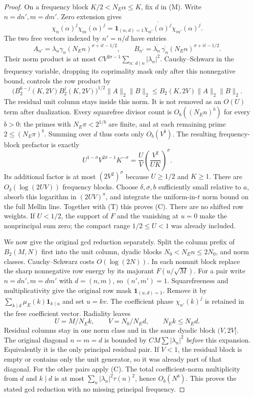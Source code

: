 \documentclass[11pt]{article}
\theoremstyle{remark}\newtheorem{remark}[theorem]{Remark}
\begin{document}
\begin{proof}
On a frequency block $K/2<N_E\alpha\le K$, fix $d$ in (M).
Write $n=dn',m=dm'$. Zero extension gives
\[
 \overline{\chi_n(\alpha)^j}\chi_m(\alpha)^j
 =\mathbf1_{(\alpha,d)=1}
             \overline{\chi_{n'}(\alpha)^j}\chi_{m'}(\alpha)^j.
\]
The two free vectors indexed by $n'=n/d$ have entries
\[
 A_{n'}=\lambda_n\gamma_n(N_En)^{\sigma+it-1/2},
 \qquad
 B_{n'}=\overline{\lambda_n}\,\overline{\gamma_n}
                          (N_En)^{\sigma+it-1/2}.
\]
Their norm product is at most
$C V^{2\sigma-1}\sum_{n:\,d\mid n}|\lambda_n|^2$.
Cauchy--Schwarz in the frequency variable, dropping its
coprimality mask only after this nonnegative bound, controls
the row product by
\[
 \bigl(B_2^{6-j}(K,2V)B_2^j(K,2V)\bigr)^{1/2}
                \|A\|_2\|B\|_2
 \le B_2(K,2V)\|A\|_2\|B\|_2.
\]
The residual unit column stays inside this norm. It is not
removed as an $O(U)$ term after dualization.
Every squarefree divisor count is $O_b((N_En)^b)$ for every $b>0$:
the primes with $N_E\pi<2^{1/b}$ are finite, and at each remaining
prime $2\le(N_E\pi)^b$.
Summing over $d$ thus costs only $O_b(V^b)$.
The resulting frequency-block prefactor is exactly
\[
 U^{1-\sigma}V^{2\sigma-1}K^{-\sigma}
 =\frac UV\left(\frac{V^2}{UK}\right)^\sigma.
\]
Its additional factor is at most $(2V^2)^\sigma$ because
$U\ge1/2$ and $K\ge1$. There are $O_\delta(\log(2UV))$ frequency
blocks. Choose $\delta,\sigma,b$ sufficiently small relative
to $a$, absorb this logarithm in $(2UV)^a$, and integrate the
uniform-in-$t$ norm bound on the full Mellin line. Together
with (T) this proves (C). There are no shifted row weights.
If $U<1/2$, the support of $F$ and the vanishing at $u=0$
make the nonprincipal sum zero; the compact range
$1/2\le U<1$ was already included.

We now give the original gcd reduction separately.
Split the column prefix of $B_2(M,N)$ first into the unit
column, dyadic blocks $N_0<N_En\le2N_0$, and norm classes.
Cauchy--Schwarz costs $O(\log(2N))$.
In each nonunit block replace the sharp nonnegative row energy
by its majorant $F(u/\sqrt M)$. For a pair write
$n=dn',m=dm'$ with $d=(n,m)$, so $(n',m')=1$.
Squarefreeness and multiplicativity give the original row mask
$\mathbf1_{(u,d)=1}$. Remove it by
$\sum_{k\mid d}\mu_E(k)\mathbf1_{k\mid u}$ and set $u=kv$.
The coefficient phase $\chi_{n'}(k)^j$ is retained in the free
coefficient vector. Radiality leaves
\[
 U=M/N_Ek,\qquad V=N_0/N_Ed,\qquad N_Ek\le N_Ed.                \tag{G}
\]
Residual columns stay in one norm class and in the same dyadic
block $(V,2V]$. The original diagonal $n=m=d$ is bounded by
$CM\sum|\lambda_n|^2$ \emph{before} this expansion.
Equivalently it is the only principal residual pair.
If $V<1$, the residual block is empty or contains only the unit
generator, so it was already part of that diagonal.
For the other pairs apply (C).
The total coefficient-norm multiplicity from $d$ and $k\mid d$
is at most $\sum_n|\lambda_n|^2\tau(n)^2$, hence $O_b(N^b)$.
This proves the stated gcd reduction with no missing
principal frequency.


\end{proof}
\end{document}

